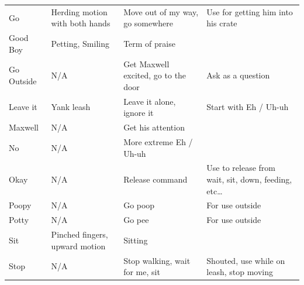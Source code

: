 \documentclass[pdftex,12pt]{article}
\begin{document}
\begin{table}[H]
\begin{adjustwidth}{-4.5cm}{-4.5cm}
\begin{center}
\begin{tabular}{lp{}p{}p{}}
                Go          & Herding motion with both hands                   & Move out of my way, go somewhere                      & Use for getting him into his crate                                 \\
                Good Boy    & Petting, Smiling                                 & Term of praise                                        &                                                                    \\
                Go Outside  & N/A                                              & Get Maxwell excited, go to the door                   & Ask as a question                    \\
                Leave it    & Yank leash                                       & Leave it alone, ignore it                             & Start with Eh / Uh-uh                                              \\
                Maxwell     & N/A                                              & Get his attention                                     &                                                                    \\
                No          & N/A                                              & More extreme Eh / Uh-uh                               &                                                                    \\
                Okay        & N/A                                              & Release
                command                                       & Use to release from
                wait, sit, down, feeding, etc\ldots                \\
                Poopy       & N/A                                              & Go poop                               & For use outside                                                    \\
                Potty       & N/A                                              & Go pee                                & For use outside                                                    \\
                Sit         & Pinched fingers, upward motion                   & Sitting                                               &                                                                    \\
                Stop        & N/A                                              & Stop walking, wait for me, sit                        & Shouted, use while on leash, stop moving                           \\

\end{tabular}
\end{center}
\end{adjustwidth}
\end{table}
\end{document}
